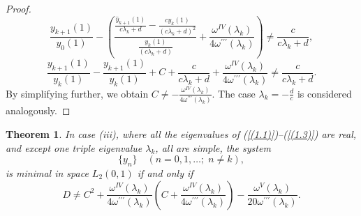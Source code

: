 \documentclass[10pt,a4paper]{amsart}
\newtheorem{thm}{Theorem}[section]
\numberwithin{equation}{section}
\begin{document}
\begin{proof}
$$
\frac{{y}_{k+1}(1)}{y_{0}(1)}- \left(\frac{\frac{\hat{y}_{k+1}(1)}{c\lambda_{k}+d} - \frac{cy_{k}(1)}{{(c\lambda_{k}+d)}^{2}}}{\frac{y_{k}(1)}{{(c\lambda_{k}+d)}}}+\frac{\omega^{IV}(\lambda_k)}{4\omega^{\prime\prime\prime}(\lambda_k)}\right)\neq\frac{c}{c\lambda_{k}+d} ,
$$
$$
\frac{{y}_{k+1}(1)}{y_{k}(1)}-\frac{{y}_{k+1}(1)}{y_{k}(1)}+C+ \frac{c}{c\lambda_{k}+d}+\frac{\omega^{IV}(\lambda_k)}{4\omega^{\prime\prime\prime}(\lambda_k)}\neq\frac{c}{c\lambda_{k}+d}.
$$
By simplifying further, we obtain
$C\neq-\frac{\omega^{IV}(\lambda_k)}{4\omega^{\prime\prime\prime}(\lambda_k)}$.
The case $\lambda_k=-\frac{d}{c}$ is considered analogously.
\end{proof}

\begin{thm}
In case (iii), where  all the eigenvalues of (\ref{(1.1)})--(\ref{(1.3)}) are real, and except one triple eigenvalue $\lambda_k$, all are simple, the system
\begin{equation}
  \{ y_n \} \quad (n = 0,1,\ldots;\; n \neq k), \label{(6.24)} 
\end{equation}
is minimal in space $L_2(0,1)$ if and only if
\begin{equation}
 D\neq C^2+
\frac{\omega^{IV}(\lambda_k)}{4\omega^{\prime\prime\prime}(\lambda_k)}\left(C+\frac{\omega^{IV}(\lambda_k)}{4\omega^{\prime\prime\prime}(\lambda_k)}\right)-\frac{\omega^{V}(\lambda_k)}{20\omega^{\prime\prime\prime}(\lambda_k)}. \label{(6.25)}  
\end{equation}
\end{thm}
\end{document}
